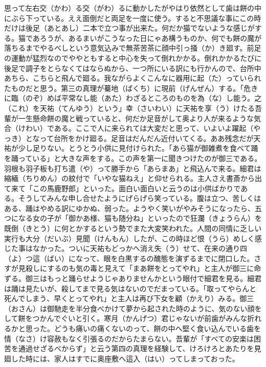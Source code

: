 \documentclass{book}
\begin{document}
思って左右交（かわ）る交（がわ）るに動かしたがやはり依然として歯は餅の中にぶら下っている。ええ面倒だと両足を一度に使う。すると不思議な事にこの時だけは後足（あとあし）二本で立つ事が出来た。何だか猫でないような感じがする。猫であろうが、あるまいがこうなった日にゃあ構うものか、何でも餅の魔が落ちるまでやるべしという意気込みで無茶苦茶に顔中引っ掻（か）き廻す。前足の運動が猛烈なのでややともすると中心を失って倒れかかる。倒れかかるたびに後足で調子をとらなくてはならぬから、一つ所にいる訳にも行かんので、台所中あちら、こちらと飛んで廻る。我ながらよくこんなに器用に起（た）っていられたものだと思う。第三の真理が驀地（ばくち）に現前（げんぜん）する。「危きに臨（のぞ）めば平常なし能（あた）わざるところのものを為（な）し能う。之（これ）を天祐（てんゆう）という」幸（さいわい）に天祐を享（う）けたる吾輩が一生懸命餅の魔と戦っていると、何だか足音がして奥より人が来るような気合（けわい）である。ここで人に来られては大変だと思って、いよいよ躍起（やっき）となって台所をかけ廻る。足音はだんだん近付いてくる。ああ残念だが天祐が少し足りない。とうとう小供に見付けられた。「あら猫が御雑煮を食べて踊を踊っている」と大きな声をする。この声を第一に聞きつけたのが御三である。羽根も羽子板も打ち遣（や）って勝手から「あらまあ」と飛込んで来る。細君は縮緬（ちりめん）の紋付で「いやな猫ねえ」と仰せられる。主人さえ書斎から出て来て「この馬鹿野郎」といった。面白い面白いと云うのは小供ばかりである。そうしてみんな申し合せたようにげらげら笑っている。腹は立つ、苦しくはある、踊はやめる訳にゆかぬ、弱った。ようやく笑いがやみそうになったら、五つになる女の子が「御かあ様、猫も随分ね」といったので狂瀾（きょうらん）を既倒（きとう）に何とかするという勢でまた大変笑われた。人間の同情に乏しい実行も大分（だいぶ）見聞（けんもん）したが、この時ほど恨（うら）めしく感じた事はなかった。ついに天祐もどっかへ消え失（う）せて、在来の通り四（よ）つ這（ばい）になって、眼を白黒するの醜態を演ずるまでに閉口した。さすが見殺しにするのも気の毒と見えて「まあ餅をとってやれ」と主人が御三に命ずる。御三はもっと踊らせようじゃありませんかという眼付で細君を見る。細君は踊は見たいが、殺してまで見る気はないのでだまっている。「取ってやらんと死んでしまう、早くとってやれ」と主人は再び下女を顧（かえり）みる。御三（おさん）は御馳走を半分食べかけて夢から起された時のように、気のない顔をして餅をつかんでぐいと引く。寒月（かんげつ）君じゃないが前歯がみんな折れるかと思った。どうも痛いの痛くないのって、餅の中へ堅く食い込んでいる歯を情（なさ）け容赦もなく引張るのだからたまらない。吾輩が「すべての安楽は困苦を通過せざるべからず」と云う第四の真理を経験して、けろけろとあたりを見廻した時には、家人はすでに奥座敷へ這入（はい）ってしまっておった。
\end{document}
